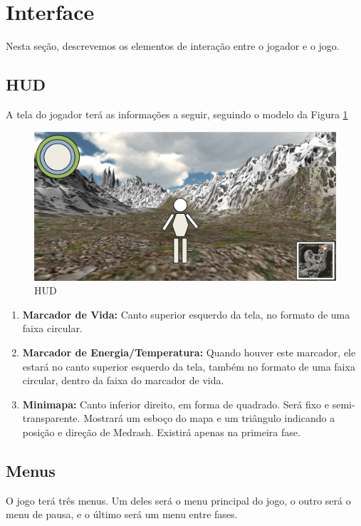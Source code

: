\section{Interface}

Nesta seção, descrevemos os elementos de interação entre o jogador e o
jogo.

\subsection{HUD}

A tela do jogador terá as informações a seguir, seguindo o modelo da
Figura \ref{fig:hud}
\begin{figure}[!ht]
 \centering
 \includegraphics[scale=0.33]{hud.png}
 \caption{HUD}
 \label{fig:hud}
\end{figure}
\begin{enumerate}
 \item {\bf Marcador de Vida:} Canto superior esquerdo da tela, no 
formato de uma faixa circular.
 \item {\bf Marcador de Energia/Temperatura:} Quando houver este marcador,
ele estará no canto superior esquerdo da tela, também no formato
de uma faixa circular, dentro da faixa do marcador de vida.
 \item {\bf Minimapa:} Canto inferior direito, em forma de quadrado.
Será fixo e semi-transparente. Mostrará um esboço do mapa e um triângulo
indicando a posição e direção de Medrash. Existirá apenas na primeira fase.
\end{enumerate}

\subsection{Menus}

O jogo terá três menus. Um deles será o menu principal do jogo, o 
outro será o menu de pausa, e o último será um menu entre fases.

